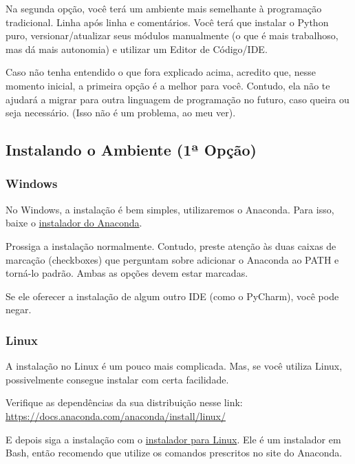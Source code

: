 \documentclass[a4paper, 11pt, brazilian]{article}
\begin{document}
Na segunda opção, você terá um ambiente mais semelhante à programação
tradicional. Linha após linha e comentários. Você terá que instalar o
Python puro, versionar/atualizar seus módulos manualmente (o que é mais
trabalhoso, mas dá mais autonomia) e utilizar um Editor de Código/IDE.

Caso não tenha entendido o que fora explicado acima, acredito que, nesse
momento inicial, a primeira opção é a melhor para você. Contudo, ela não
te ajudará a migrar para outra linguagem de programação no futuro, caso
queira ou seja necessário. (Isso não é um problema, ao meu ver).

\hypertarget{instalando-o-ambiente-1uxaa-opuxe7uxe3o}{%
\subsection{Instalando o Ambiente (1ª
Opção)}\label{instalando-o-ambiente-1uxaa-opuxe7uxe3o}}

\hypertarget{windows}{%
\subsubsection{Windows}\label{windows}}

No Windows, a instalação é bem simples, utilizaremos o Anaconda. Para
isso, baixe o
\href{https://www.anaconda.com/download/\#windows}{instalador do
Anaconda}.

Prossiga a instalação normalmente. Contudo, preste atenção às duas
caixas de marcação (checkboxes) que perguntam sobre adicionar o Anaconda
ao PATH e torná-lo padrão. Ambas as opções devem estar marcadas.

Se ele oferecer a instalação de algum outro IDE (como o PyCharm), você
pode negar.

\hypertarget{linux}{%
\subsubsection{Linux}\label{linux}}

A instalação no Linux é um pouco mais complicada. Mas, se você utiliza
Linux, possivelmente consegue instalar com certa facilidade.

Verifique as dependências da sua distribuição nesse link:
\url{https://docs.anaconda.com/anaconda/install/linux/}

E depois siga a instalação com o
\href{https://www.anaconda.com/download/\#linux}{instalador para Linux}.
Ele é um instalador em Bash, então recomendo que utilize os comandos
prescritos no site do Anaconda.
\end{document}
